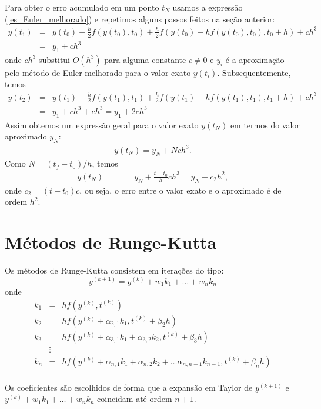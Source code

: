 Para obter o erro acumulado em um ponto $t_N$ usamos a expressão (\ref{es_Euler_melhorado}) e repetimos alguns passos feitos na seção anterior:
\begin{eqnarray*}
 y(t_1)&=&y(t_0)+\frac{h}{2}f(y(t_0),t_0)+\frac{h}{2}f(y(t_0)+hf(y(t_0),t_0),t_0+h)+ch^3\\
 &=&y_1+ch^3
\end{eqnarray*}
onde $ch^3$ substitui $O(h^3)$ para alguma constante $c\neq 0$ e $y_i$ é a aproximação pelo método de Euler melhorado para o valor exato $y(t_i)$. Subsequentemente, temos
\begin{eqnarray*}
 y(t_2)&=&y(t_1)+\frac{h}{2}f(y(t_1),t_1)+\frac{h}{2}f(y(t_1)+hf(y(t_1),t_1),t_1+h)+ch^3\\
 &=&y_1+ch^3+ch^3=y_1+2ch^3
\end{eqnarray*}
Assim obtemos um expressão geral para o valor exato $y(t_N)$ em termos do valor aproximado $y_N$:
\begin{eqnarray*}
 y(t_N)=y_{N}+Nch^3.
\end{eqnarray*}
Como $N=(t_f-t_0)/h$, temos
\begin{eqnarray*}
 y(t_N)&=&=y_{N}+\frac{t-t_0}{h}ch^3=y_{N}+c_2h^2,
\end{eqnarray*}
onde $c_2=(t-t_0)c$, ou seja, o erro entre o valor exato e o aproximado é de ordem $h^2$.




\section{Métodos de Runge-Kutta}\label{sec_RK}

Os métodos de Runge-Kutta consistem em iterações do tipo:
$$y^{(k+1)}=y^{(k)}+w_1 k_1 + \ldots + w_n k_n$$
onde
\begin{eqnarray*}
k_1&=&hf(y^{(k)},t^{(k)})\\
k_2&=&hf(y^{(k)}+\alpha_{2,1}k_1,t^{(k)}+\beta_{2}h)\\
k_3&=&hf(y^{(k)}+\alpha_{3,1}k_1+\alpha_{3,2}k_2,t^{(k)}+\beta_{3}h)\\
&\vdots&\\
k_n&=&hf(y^{(k)}+\alpha_{n,1}k_1+\alpha_{n,2}k_2+\ldots \alpha_{n,n-1}k_{n-1},t^{(k)}+\beta_{n}h)\\
\end{eqnarray*}

Os coeficientes são escolhidos de forma que a expansão em Taylor de $y^{(k+1)}$ e $y^{(k)}+w_1 k_1 + \ldots + w_n k_n$ coincidam até ordem $n+1$.

